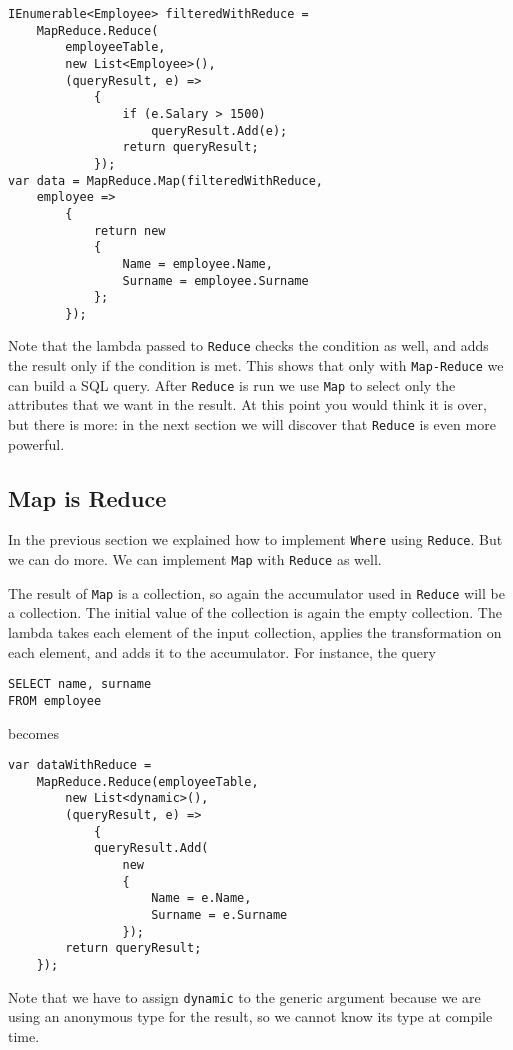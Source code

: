 \begin{lstlisting}
IEnumerable<Employee> filteredWithReduce =
	MapReduce.Reduce(
		employeeTable,
		new List<Employee>(),
		(queryResult, e) =>
			{
				if (e.Salary > 1500)
					queryResult.Add(e);
				return queryResult;
			});
var data = MapReduce.Map(filteredWithReduce,
	employee =>
		{
			return new
			{
				Name = employee.Name,
				Surname = employee.Surname
			};
		});
\end{lstlisting}

Note that the lambda passed to \texttt{Reduce} checks the condition as well, and adds the result only if the condition is met. This shows that only with \texttt{Map-Reduce} we can build a SQL query. After \texttt{Reduce} is run we use \texttt{Map} to select only the attributes that we want in the result. At this point you would think it is over, but there is more: in the next section we will discover that \texttt{Reduce} is even more powerful.

\subsection{Map is Reduce}
In the previous section we explained how to implement \texttt{Where} using \texttt{Reduce}. But we can do more. We can implement \texttt{Map} with \texttt{Reduce} as well.

The result of \texttt{Map} is a collection, so again the accumulator used in \texttt{Reduce} will be a collection. The initial value of the collection is again the empty collection. The lambda takes each element of the input collection, applies the transformation on each element, and adds it to the accumulator. For instance, the query

\begin{lstlisting}
SELECT name, surname
FROM employee
\end{lstlisting}

\noindent
becomes

\begin{lstlisting}
var dataWithReduce =
	MapReduce.Reduce(employeeTable,
		new List<dynamic>(),
		(queryResult, e) =>
			{
			queryResult.Add(
				new
				{
					Name = e.Name,
					Surname = e.Surname
				});
		return queryResult;
	});
\end{lstlisting}

Note that we have to assign \texttt{dynamic} to the generic argument because we are using an anonymous type for the result, so we cannot know its type at compile time.


